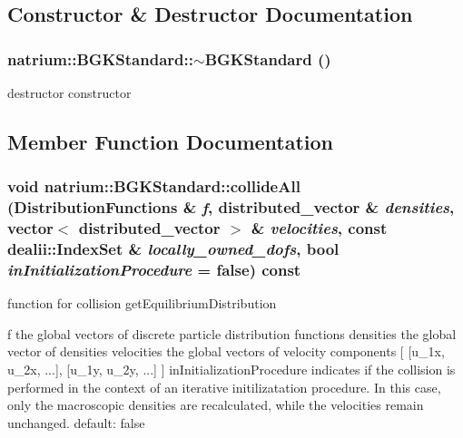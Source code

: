 \subsection{Constructor \& Destructor Documentation}
\hypertarget{classnatrium_1_1BGKStandard_aa55035be79098a762cf4f0ef308d41e5}{
\subsubsection[{$\sim$BGKStandard}]{\setlength{\rightskip}{0pt plus 5cm}natrium::BGKStandard::$\sim$BGKStandard ()}}
\label{classnatrium_1_1BGKStandard_aa55035be79098a762cf4f0ef308d41e5}


destructor constructor 

\subsection{Member Function Documentation}
\hypertarget{classnatrium_1_1BGKStandard_a8e0493b063d56275d7ee607e25c4145e}{
\subsubsection[{collideAll}]{\setlength{\rightskip}{0pt plus 5cm}void natrium::BGKStandard::collideAll ({\bf DistributionFunctions} \& {\em f}, \/  distributed\_\-vector \& {\em densities}, \/  vector$<$ distributed\_\-vector $>$ \& {\em velocities}, \/  const dealii::IndexSet \& {\em locally\_\-owned\_\-dofs}, \/  bool {\em inInitializationProcedure} = {\ttfamily false}) const}}
\label{classnatrium_1_1BGKStandard_a8e0493b063d56275d7ee607e25c4145e}


function for collision getEquilibriumDistribution

f the global vectors of discrete particle distribution functions densities the global vector of densities velocities the global vectors of velocity components \mbox{[} \mbox{[}u\_\-1x, u\_\-2x, ...\mbox{]}, \mbox{[}u\_\-1y, u\_\-2y, ...\mbox{]} \mbox{]} inInitializationProcedure indicates if the collision is performed in the context of an iterative initilizatation procedure. In this case, only the macroscopic densities are recalculated, while the velocities remain unchanged. default: false 

